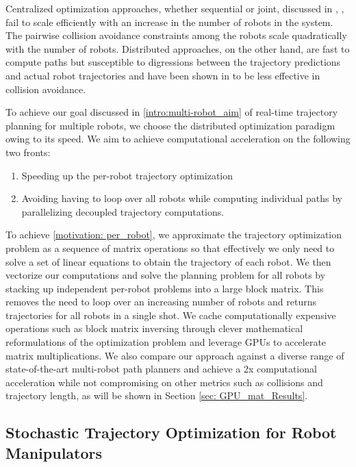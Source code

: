 Centralized optimization approaches, whether sequential or joint, discussed in \cite{chen2015decoupled}, \cite{incremental_scp_how}, fail to scale efficiently with an increase in the number of robots in the system. The pairwise collision avoidance constraints among the robots scale quadratically with the number of robots. Distributed approaches, on the other hand, are fast to compute paths but susceptible to digressions between the trajectory predictions and actual robot trajectories and have been shown in \cite{dmpc_carlos} to be less effective in collision avoidance. 

To achieve our goal discussed in \ref{intro:multi-robot_aim} of real-time trajectory planning for multiple robots, we choose the distributed optimization paradigm owing to its speed. We aim to achieve computational acceleration on the following two fronts:

\begin{enumerate}
    \item \label{motivation: per_robot} Speeding up the per-robot trajectory optimization 
    \item \label{motivation:parallelization} Avoiding having to loop over all robots while computing individual paths by parallelizing decoupled trajectory computations.
\end{enumerate}

To achieve \ref{motivation: per_robot}, we approximate the trajectory optimization problem as a sequence of matrix operations so that effectively we only need to solve a set of linear equations to obtain the trajectory of each robot. We then vectorize our computations and solve the planning problem for all robots by stacking up independent per-robot problems into a large block matrix. This removes the need to loop over an increasing number of robots and returns trajectories for all robots in a single shot. We cache computationally expensive operations such as block matrix inversing through clever mathematical reformulations of the optimization problem and leverage GPUs to accelerate matrix multiplications. We also compare our approach against a diverse range of state-of-the-art multi-robot path planners and achieve a 2x computational acceleration while not compromising on other metrics such as collisions and trajectory length, as will be shown in Section \ref{sec: GPU_mat_Results}.

\subsection{Stochastic Trajectory Optimization for Robot Manipulators}


